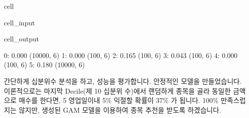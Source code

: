 \documentclass[letterpaper,10pt,english]{jupyterBook}
\begin{document}
\begin{sphinxuseclass}{cell}\begin{sphinxVerbatimInput}

\begin{sphinxuseclass}{cell_input}
\begin{sphinxVerbatim}[commandchars=\\\{\}]
   
\end{sphinxVerbatim}

\end{sphinxuseclass}\end{sphinxVerbatimInput}
\begin{sphinxVerbatimOutput}

\begin{sphinxuseclass}{cell_output}
\begin{sphinxVerbatim}[commandchars=\\\{\}]
0:  0.000 (10000, 6)
1:  0.000 (100, 6)
2:  0.165 (100, 6)
3:  0.043 (100, 6)
4:  0.000 (100, 6)
5:  0.180 (10000, 6)
\end{sphinxVerbatim}

\end{sphinxuseclass}\end{sphinxVerbatimOutput}

\end{sphinxuseclass}
\sphinxAtStartPar
 간단하게 십분위수 분석을 하고, 성능을 평가합니다. 안정적인 모델을 만들었습니다. 이론적으로는 마지막 Decile(제 10 십분위 수)에서 랜덤하게 종목을 골라 동일한 금액으로 매수를 한다면, 5 영업일이내 5\% 익절할 확률이 37\% 가 됩니다.  100\% 만족스럽지는 않지만, 생성된 GAM 모델을 이용하여 종목 추천을 받도록 하겠습니다.
\end{document}
